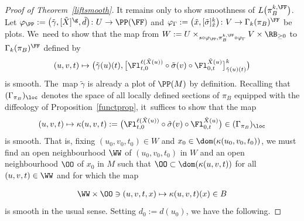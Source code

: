\begin{proof}[Proof of Theorem~\ref{liftsmooth}]
It remains only to show smoothness of $L\big(\pi_{B}^{k,\FF}\big)$. Let $\varphi_{\PP}:=\big(\tilde{\gamma},[\tilde{X}]^{\g},\tilde{d}\big)\colon U\rightarrow\PP(\FF)$ and $\varphi_{\Gamma}:=\big(\tilde{x},[\tilde{\sigma}]^{k}_{\tilde{x}}\big)\colon V\rightarrow\Gamma_{k}(\pi_{B})^{\FF}$ be plots. We~need to show that the map from $W:=U\times_{s\circ\varphi_{\PP},\pi_{B}^{k,\FF}\circ\varphi_{\Gamma}}V\times\RB_{\geq0}$ to $\Gamma_{k}(\pi_{B})^{\FF}$ defined by
\begin{gather*}
(u,v,t)\mapsto \big(\tilde{\gamma}(u)(t),\big[\Fl^{\ell(\tilde{X}(u))}_{t,0}\circ \tilde{\sigma}(v)\circ\Fl^{\tilde{X}(u)}_{0,t}\big]^{k}_{\tilde{\gamma}(u)(t)}\big)
\end{gather*}
is smooth. The~map $\tilde{\gamma}$ is already a plot of $\PP(M)$ by definition. Recalling that $(\Gamma_{\pi_{B}})_{\loc}$ denotes the space of all locally defined sections of $\pi_{B}$ equipped with the diffeology of Proposition~\ref{functprop}, it~suffices to show that the map
\begin{gather*}
(u,v,t)\mapsto\kappa(u,v,t):=\big(\Fl^{\ell(\tilde{X}(u))}_{t,0}\circ\tilde{\sigma}(v)\circ\Fl^{\tilde{X}(u)}_{0,t}\big)\in(\Gamma_{\pi_{B}})_{\loc}
\end{gather*}
is smooth. That is, fixing $(u_{0},v_{0},t_{0})\in W$ and $x_{0}\in\dom(\kappa(u_{0},v_{0},t_{0}))$, we must find an open neighbourhood $\WW$ of $(u_{0},v_{0},t_{0})$ in $W$ and an open neighbourhood $\OO$ of $x_{0}$ in $M$ such that $\OO\subset\dom(\kappa(u,v,t))$ for all $(u,v,t)\in\WW$ and for which the map
{\samepage\begin{gather*}
\WW\times\OO\ni(u,v,t,x)\mapsto \kappa(u,v,t)(x)\in B
\end{gather*}
is smooth in the usual sense. Setting $d_{0}:=d(u_{0})$, we have the following.

}


\end{proof}
